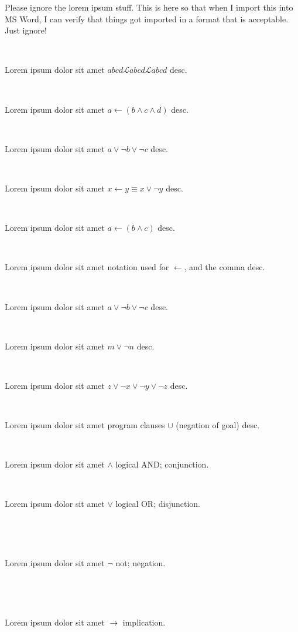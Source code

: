 \documentclass[12pt]{article}
\begin{document}
Please ignore the lorem ipsum stuff. This is here so that when I import this into MS Word, I can verify that things got imported in a format that is acceptable.  Just ignore!



\centerline{~}

Lorem ipsum dolor sit amet $ abcd \mathscr{L} abcd \mathcal{L}  abcd $ desc.

\centerline{~}

Lorem ipsum dolor sit amet $ a \leftarrow ( b \wedge c \wedge d )  $ desc.

\centerline{~}

Lorem ipsum dolor sit amet $ a \vee \neg b \vee \neg c $ desc.

\centerline{~}

Lorem ipsum dolor sit amet $ x \leftarrow y \equiv x \vee \neg y $ desc.

\centerline{~}

Lorem ipsum dolor sit amet $ a \leftarrow ( b \wedge c ) $ desc.

\centerline{~}

Lorem ipsum dolor sit amet notation used for $ \leftarrow $, and the comma  desc.

\centerline{~}

Lorem ipsum dolor sit amet $ a \vee \neg b \vee \neg c $ desc.

\centerline{~}

Lorem ipsum dolor sit amet $ m \vee \neg n $ desc.

\centerline{~}

Lorem ipsum dolor sit amet $ z \vee \neg x \vee \neg y \vee \neg z $ desc.

\centerline{~}

Lorem ipsum dolor sit amet program clauses $ \cup $ (negation of goal) desc.


\centerline{~}

Lorem ipsum dolor sit amet $ \wedge $ logical AND; conjunction.

\centerline{~}

Lorem ipsum dolor sit amet $ \vee $ logical OR; disjunction.

\centerline{~}

\centerline{~}

Lorem ipsum dolor sit amet $ \neg $ not; negation.

\centerline{~}

\centerline{~}

Lorem ipsum dolor sit amet $ \rightarrow $ implication.
\end{document}
